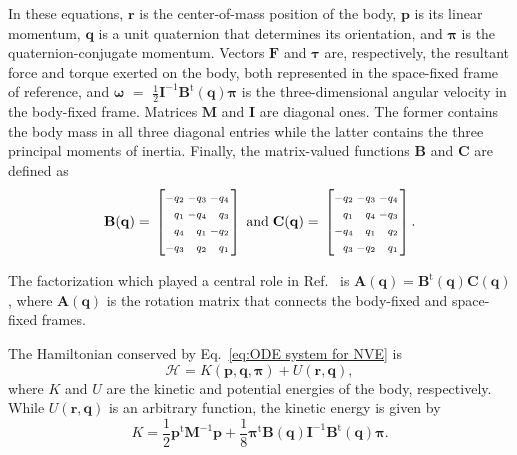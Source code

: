 \documentclass[
journal=jctcce,
layout=twocolumn
]{achemso}
\makeatletter
\newcommand{\mt}[1]{\boldsymbol{\mathbf{#1}}}   %
\newcommand{\vt}[1]{\boldsymbol{\mathbf{#1}}}   %
\newcommand{\tr}[1]{#1^\text{t}}                %
\newcommand{\Ham}[1]{{\mathcal H}_\text{#1}}    %
\newenvironment{smallarray}[1]                          %
{\null\,\vcenter\bgroup\scriptsize
	\renewcommand{\arraystretch}{1.5}
	\arraycolsep=.13885em
	\hbox\bgroup$\left[\array{@{}#1@{}}}
{\endarray\right]$\egroup\egroup\,\null}
\makeatother
\begin{document}
In these equations, $\vt r$ is the center-of-mass position of the body, $\vt p$ is its linear momentum, $\vt q$ is a unit quaternion that determines its orientation, and $\vt \pi$ is the quaternion-conjugate momentum.
Vectors $\vt F$ and $\vt \tau$ are, respectively, the resultant force and torque exerted on the body, both represented in the space-fixed frame of reference, and $\vt \omega$ $=$ $\frac{1}{2} {\mt I}^{-1} \tr{\mt B}(\vt q) {\vt \pi}$ is the three-dimensional angular velocity in the body-fixed frame.
Matrices $\mt M$ and $\mt I$ are diagonal ones.
The former contains the body mass in all three diagonal entries while the latter contains the three principal moments of inertia.
Finally, the matrix-valued functions $\mt B$ and $\vt C$ are defined as
\begin{equation*}
\label{eq:def_B_and_C}
\mt B(\vt q) = \begin{smallarray}{rrrr}
-q_2 & -q_3 & -q_4 \\
 q_1 & -q_4 &  q_3 \\
 q_4 &  q_1 & -q_2 \\
-q_3 &  q_2 &  q_1
\end{smallarray}
%
\; \text{and} \;
%
\mt C(\vt q) = \begin{smallarray}{rrrr}
-q_2 & -q_3 & -q_4 \\
 q_1 &  q_4 & -q_3 \\
-q_4 &  q_1 &  q_2 \\
 q_3 & -q_2 &  q_1
\end{smallarray}.
\end{equation*}

The factorization which played a central role in Ref.~ is ${\mt A}(\vt q) = \tr{\mt B}(\vt q) {\mt C}(\vt q)$, where ${\mt A}(\vt q)$ is the rotation matrix that connects the body-fixed and space-fixed frames.

The Hamiltonian conserved by Eq.~\eqref{eq:ODE system for NVE} is
\begin{equation}
\label{eq:Hamiltonian}
\Ham{} = K(\vt p, \vt q, \vt \pi) + U(\vt r,\vt q),
\end{equation}
where $K$ and $U$ are the kinetic and potential energies of the body, respectively.
While $U(\vt r, \vt q)$ is an arbitrary function, the kinetic energy is given by
\begin{equation}
\label{eq:kinetic energy}
K = \frac{1}{2} \tr{\vt p} {\mt M}^{-1} {\vt p} + \frac{1}{8} \tr{\vt \pi} {\mt B}(\vt q) {\mt I}^{-1} \tr{\mt B}(\vt q) {\vt \pi}.
\end{equation}
\end{document}

